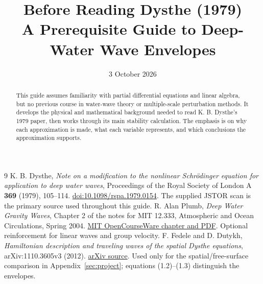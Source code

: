 \documentclass[11pt]{article}
\title{Before Reading Dysthe (1979)\\\large A Prerequisite Guide to Deep-Water Wave Envelopes}
\author{}
\date{3 October 2026}
\begin{document}
\maketitle
\begin{abstract}
This guide assumes familiarity with partial differential equations and linear
algebra, but no previous course in water-wave theory or multiple-scale
perturbation methods. It develops the physical and mathematical background
needed to read K. B. Dysthe's 1979 paper, then works through its main stability
calculation. The emphasis is on why each approximation is made, what each
variable represents, and which conclusions the approximation supports.
\end{abstract}
\tableofcontents
\clearpage











\appendix


\clearpage
\begin{thebibliography}{9}
K. B. Dysthe, \emph{Note on a modification to the nonlinear Schr\"odinger
equation for application to deep water waves}, Proceedings of the Royal
Society of London A \textbf{369} (1979), 105--114.
\href{https://doi.org/10.1098/rspa.1979.0154}{doi:10.1098/rspa.1979.0154}.
The supplied JSTOR scan is the primary source used throughout this guide.
R. Alan Plumb, \emph{Deep Water Gravity Waves}, Chapter 2 of the notes for
MIT 12.333, Atmospheric and Ocean Circulations, Spring 2004.
\href{https://ocw.mit.edu/courses/12-333-atmospheric-and-ocean-circulations-spring-2004/resources/ch2/}{MIT OpenCourseWare chapter and PDF}.
Optional reinforcement for linear waves and group velocity.
F. Fedele and D. Dutykh, \emph{Hamiltonian description and traveling waves of
the spatial Dysthe equations}, arXiv:1110.3605v3 (2012).
\href{https://arxiv.org/abs/1110.3605v3}{arXiv source}.
Used only for the spatial/free-surface comparison in
Appendix~\ref{sec:project}; equations (1.2)--(1.3) distinguish the envelopes.
\end{thebibliography}
\end{document}
